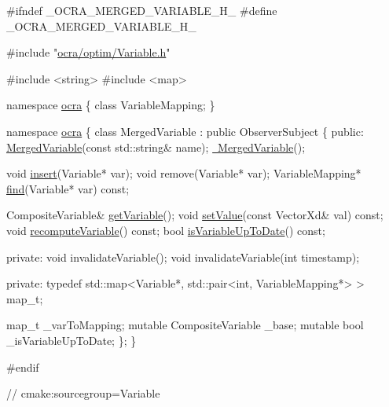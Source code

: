 \begin{DoxyCodeInclude}
\textcolor{preprocessor}{#ifndef \_OCRA\_MERGED\_VARIABLE\_H\_}
\textcolor{preprocessor}{#define \_OCRA\_MERGED\_VARIABLE\_H\_}

\textcolor{preprocessor}{#include "\hyperlink{Variable_8h}{ocra/optim/Variable.h}"}

\textcolor{preprocessor}{#include <string>}
\textcolor{preprocessor}{#include <map>}

\textcolor{keyword}{namespace }\hyperlink{namespaceocra}{ocra}
\{
  \textcolor{keyword}{class }VariableMapping;
\}

\textcolor{keyword}{namespace }\hyperlink{namespaceocra}{ocra}
\{
  \textcolor{keyword}{class }MergedVariable
    : \textcolor{keyword}{public} ObserverSubject
  \{
  \textcolor{keyword}{public}:
    \hyperlink{classocra_1_1MergedVariable_ac6dcd7217ac6a6097ae95f5fe2afc513}{MergedVariable}(\textcolor{keyword}{const} std::string& name);
    \hyperlink{classocra_1_1MergedVariable_aa126050631c068dba3e1d12f31dea9ec}{~MergedVariable}();

    \textcolor{keywordtype}{void} \hyperlink{classocra_1_1MergedVariable_aa91f4ed9514c3dd4bf1ae4e25cf1e118}{insert}(Variable* var);
    \textcolor{keywordtype}{void} \textcolor{keyword}{remove}(Variable* var);
    VariableMapping* \hyperlink{classocra_1_1MergedVariable_a632fc3715c9def6d3dafac17be4c962d}{find}(Variable* var) \textcolor{keyword}{const};

    CompositeVariable& \hyperlink{classocra_1_1MergedVariable_afa4986407c3fbaebe268fd248b2c4bcf}{getVariable}();
    \textcolor{keywordtype}{void} \hyperlink{classocra_1_1MergedVariable_af144217ae6b5299a8b390b7a9d3e1f6f}{setValue}(\textcolor{keyword}{const} VectorXd& val) \textcolor{keyword}{const};
    \textcolor{keywordtype}{void} \hyperlink{classocra_1_1MergedVariable_a426f8f855177b127c03e589105ec984e}{recomputeVariable}() \textcolor{keyword}{const};
    \textcolor{keywordtype}{bool} \hyperlink{classocra_1_1MergedVariable_aacd4a3af9836eca6de26ab61eb8c3255}{isVariableUpToDate}() \textcolor{keyword}{const};

  \textcolor{keyword}{private}:
    \textcolor{keywordtype}{void} invalidateVariable();
    \textcolor{keywordtype}{void} invalidateVariable(\textcolor{keywordtype}{int} timestamp);

  \textcolor{keyword}{private}:
    \textcolor{keyword}{typedef} std::map<Variable*, std::pair<int, VariableMapping*> > map\_t;

    map\_t \_varToMapping;
    \textcolor{keyword}{mutable} CompositeVariable \_base;
    \textcolor{keyword}{mutable} \textcolor{keywordtype}{bool} \_isVariableUpToDate;
  \};
\}

\textcolor{preprocessor}{#endif}

\textcolor{comment}{// cmake:sourcegroup=Variable}
\end{DoxyCodeInclude}
 
